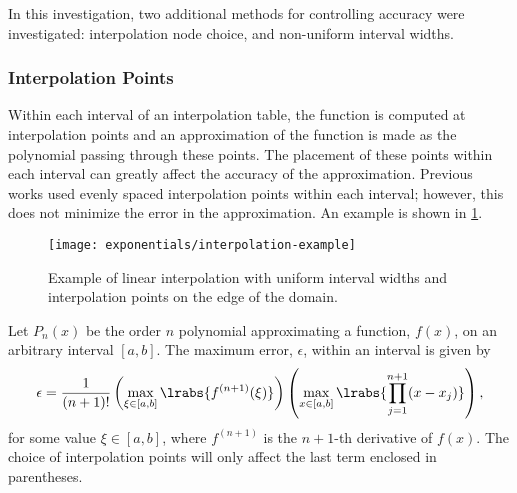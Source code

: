 {{{      In this investigation, two additional methods for controlling accuracy were investigated: interpolation node choice, and non-uniform interval widths.
      \subsubsection{Interpolation Points}{\label{sssec:ET:Interpolation Points}
        Within each interval of an interpolation table, the function is computed at interpolation points and an approximation of the function is made as the polynomial passing through these points.
        The placement of these points within each interval can greatly affect the accuracy of the approximation.
        Previous works \cite{Yamamoto2004,Kochunas2013} used evenly spaced interpolation points within each interval; however, this does not minimize the error in the approximation.
        An example is shown in \cref{fig:LSMOC:ET:Interpolation Example}.

        \begin{figure}
          \centering
          \texttt{[image: exponentials/interpolation-example]}
          \caption{Example of linear interpolation with uniform interval widths and interpolation points on the edge of the domain.\label{fig:LSMOC:ET:Interpolation Example}}
        \end{figure}

        Let $P_n(x)$ be the order $n$ polynomial approximating a function, $f(x)$, on an arbitrary interval $[a,b]$.
        The maximum error, $\epsilon$, within an interval is given by
        \begin{equation}\label{eq:LSMOC:ET:Interpolation Error}
          \epsilon = \frac{1}{(n+1)!}\left(\max_{\xi\in[a,b]}\lrabs{f^{(n+1)}(\xi)}\right)\left(\max_{x\in[a,b]}\lrabs{\prodl[j=1][n+1](x-x_j)}\right),
        \end{equation}
        for some value $\xi\in[a,b]$, where $f^{(n+1)}$ is the $n+1$-th derivative of $f(x)$.
        The choice of interpolation points will only affect the last term enclosed in parentheses.

}}}}
